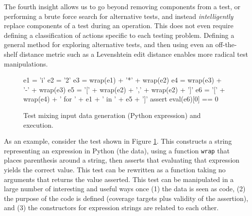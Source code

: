 The fourth insight allows us to go beyond removing components
from a test, or performing a brute force search for alternative tests,
and instead \emph{intelligently} replace components of a test during an
operation.  This does not even require defining a classification of
actions specific to each testing problem.  Defining a
general method for exploring alternative tests, and then using even an off-the-shelf distance metric
such as a Levenshtein edit distance \cite{lev} enables 
more radical test manipulations.



{\center{}\vskip 0.1in}



\begin{figure}
{\scriptsize
\begin{code}
e1 = 'i'
e2 = '2'
e3 = wrap(e1) + '*' + wrap(e2)
e4 = wrap(e3) + '-' + wrap(e3)
e5 = '[' + wrap(e2) + ',' + wrap(e2) + ']'
e6 = '[' + wrap(e4) + ' for ' + e1 + ' in ' + e5 + ']'
assert eval(e6)[0] == 0
\end{code}
}
\caption{Test mixing input data generation (Python expression) and
  execution.}
\label{fig:test}
\end{figure}

As an example, consider the test shown in Figure \ref{fig:test}.  This
constructs a string representing an expression in Python (the data),
using a function {\tt wrap} that places parenthesis around a string,
then asserts that evaluating that expression yields the
correct value.  This test can be rewritten as a function taking no
arguments that returns the value asserted.  This test can be
manipulated in a large number of interesting and useful ways once (1) the
data is seen as code, (2) the purpose of the code is defined (coverage
targets plus
validity of the assertion), and (3) the constructors for expression 
strings are related to each other.

